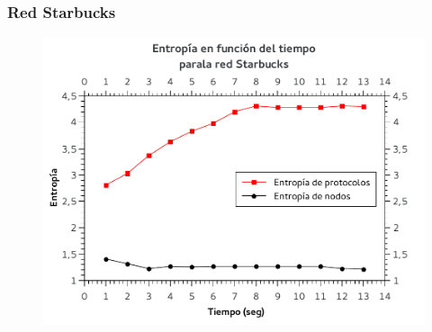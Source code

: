 
\FloatBarrier
\subsubsection{Red Starbucks}

\begin{figure}[h!]
  \begin{center}
    \includegraphics{graficos/entropia-tiempo-starbucks.pdf}
	\caption{}
    \label{fig:proto-starbucks}  
  \end{center}
\end{figure}



